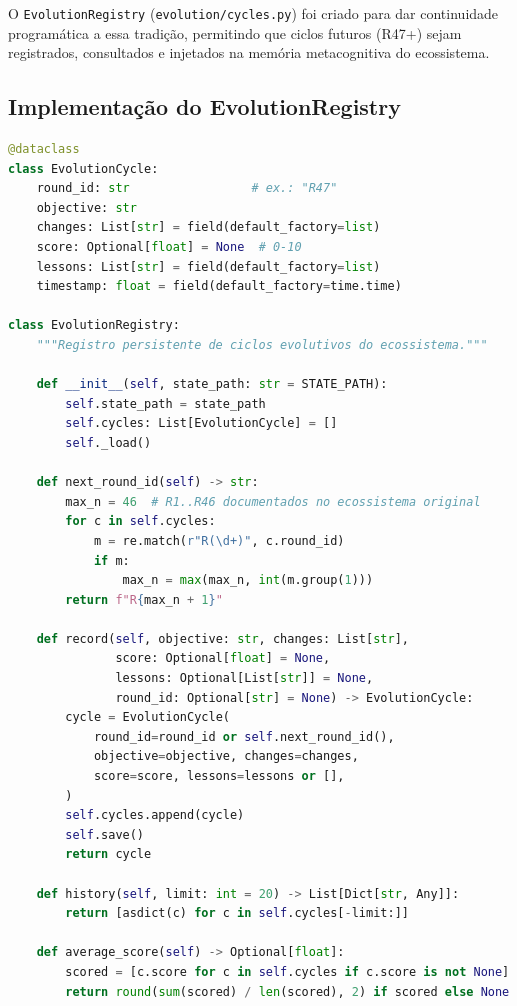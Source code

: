 O \texttt{EvolutionRegistry} (\texttt{evolution/cycles.py}) foi criado para dar continuidade programática a essa tradição, permitindo que ciclos futuros (R47+) sejam registrados, consultados e injetados na memória metacognitiva do ecossistema.

\subsection{Implementação do EvolutionRegistry}

\begin{lstlisting}[language=Python, caption={EvolutionRegistry: registro persistente de ciclos evolutivos (\texttt{evolution/cycles.py})}, label={lst:evolution-registry}, float=htbp]
@dataclass
class EvolutionCycle:
    round_id: str                 # ex.: "R47"
    objective: str
    changes: List[str] = field(default_factory=list)
    score: Optional[float] = None  # 0-10
    lessons: List[str] = field(default_factory=list)
    timestamp: float = field(default_factory=time.time)

class EvolutionRegistry:
    """Registro persistente de ciclos evolutivos do ecossistema."""

    def __init__(self, state_path: str = STATE_PATH):
        self.state_path = state_path
        self.cycles: List[EvolutionCycle] = []
        self._load()

    def next_round_id(self) -> str:
        max_n = 46  # R1..R46 documentados no ecossistema original
        for c in self.cycles:
            m = re.match(r"R(\d+)", c.round_id)
            if m:
                max_n = max(max_n, int(m.group(1)))
        return f"R{max_n + 1}"

    def record(self, objective: str, changes: List[str],
               score: Optional[float] = None,
               lessons: Optional[List[str]] = None,
               round_id: Optional[str] = None) -> EvolutionCycle:
        cycle = EvolutionCycle(
            round_id=round_id or self.next_round_id(),
            objective=objective, changes=changes,
            score=score, lessons=lessons or [],
        )
        self.cycles.append(cycle)
        self.save()
        return cycle

    def history(self, limit: int = 20) -> List[Dict[str, Any]]:
        return [asdict(c) for c in self.cycles[-limit:]]

    def average_score(self) -> Optional[float]:
        scored = [c.score for c in self.cycles if c.score is not None]
        return round(sum(scored) / len(scored), 2) if scored else None


\end{lstlisting}
